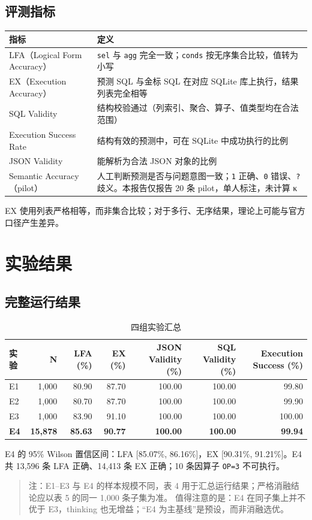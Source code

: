 \documentclass[conference]{IEEEtran}
\begin{document}
\subsection{评测指标}
\needspace{3.2cm}
\noindent\begin{minipage}{\linewidth}
\centering
\scriptsize
\begin{tabular}{@{}>{\raggedright\arraybackslash}p{3.24cm}>{\raggedright\arraybackslash}p{4.16cm}@{}}
\toprule
指标 & 定义 \\
\midrule
LFA（Logical Form Accuracy） & \texttt{sel} 与 \texttt{agg} 完全一致；\texttt{conds} 按无序集合比较，值转为小写 \\
EX（Execution Accuracy） & 预测 SQL 与金标 SQL 在对应 SQLite 库上执行，结果列表完全相等 \\
SQL Validity & 结构校验通过（列索引、聚合、算子、值类型均在合法范围） \\
Execution Success Rate & 结构有效的预测中，可在 SQLite 中成功执行的比例 \\
JSON Validity & 能解析为合法 JSON 对象的比例 \\
Semantic Accuracy（pilot） & 人工判断预测是否与问题意图一致；\texttt{1} 正确、\texttt{0} 错误、\texttt{?} 歧义。本报告仅报告 20 条 pilot，单人标注，未计算 κ \\
\bottomrule
\end{tabular}
\end{minipage}\par\smallskip
EX 使用列表严格相等，而非集合比较；对于多行、无序结果，理论上可能与官方口径产生差异。
\section{实验结果}
\subsection{完整运行结果}
\begin{table}[t]
\centering
\footnotesize
\caption{四组实验汇总}
\label{tab:t6}
\begin{tabular}{@{}lrrrrrr@{}}
\toprule
实验 & N & LFA (\%) & EX (\%) & JSON Validity (\%) & SQL Validity (\%) & Execution Success (\%) \\
\midrule
E1 & 1,000 & 80.90 & 87.70 & 100.00 & 100.00 & 99.80 \\
E2 & 1,000 & 80.70 & 87.70 & 100.00 & 100.00 & 99.90 \\
E3 & 1,000 & 83.90 & 91.10 & 100.00 & 100.00 & 100.00 \\
\textbf{E4} & \textbf{15,878} & \textbf{85.63} & \textbf{90.77} & \textbf{100.00} & \textbf{100.00} & \textbf{99.94} \\
\bottomrule
\end{tabular}
\end{table}
E4 的 95\% Wilson 置信区间：LFA [85.07\%, 86.16\%]，EX [90.31\%, 91.21\%]。E4 共 13,596 条 LFA 正确、14,413 条 EX 正确；10 条因算子 \texttt{OP=3} 不可执行。
\begin{quote}\small
注：E1–E3 与 E4 的样本规模不同，表 4 用于汇总运行结果；严格消融结论应以表 5 的同一 1,000 条子集为准。
值得注意的是：E4 在同子集上并不优于 E3，thinking 也无增益；“E4 为主基线”是预设，而非消融选优。
\end{quote}
\end{document}
